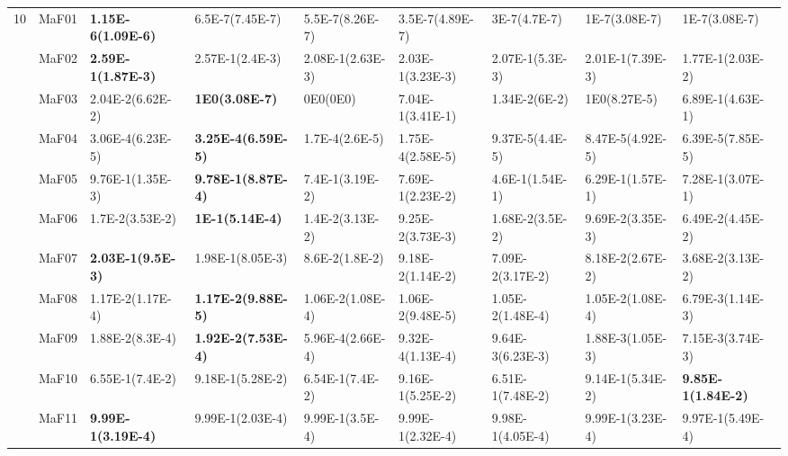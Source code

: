 \documentclass[]{article}
\begin{document}
\begin{landscape}
\begin{table}
\begin{footnotesize}
\begin{tabular}{|l|l|l|l|l|l|l|l|l|}
\multirow{15}{*}{10} & MaF01 & \cellcolor{gray95} {\bf 1.15E-6(1.09E-6)} & \cellcolor{gray95} 6.5E-7(7.45E-7) & \cellcolor{gray95} 5.5E-7(8.26E-7) & \cellcolor{gray95} 3.5E-7(4.89E-7) & \cellcolor{gray95} 3E-7(4.7E-7) & 1E-7(3.08E-7) & 1E-7(3.08E-7)\\
 & MaF02 & \cellcolor{gray95} {\bf 2.59E-1(1.87E-3)} & \cellcolor{gray95} 2.57E-1(2.4E-3) & 2.08E-1(2.63E-3) & 2.03E-1(3.23E-3) & 2.07E-1(5.3E-3) & 2.01E-1(7.39E-3) & 1.77E-1(2.03E-2)\\
 & MaF03 & 2.04E-2(6.62E-2) & \cellcolor{gray95} {\bf 1E0(3.08E-7)} & 0E0(0E0) & 7.04E-1(3.41E-1) & 1.34E-2(6E-2) & \cellcolor{gray95} 1E0(8.27E-5) & 6.89E-1(4.63E-1)\\
 & MaF04 & \cellcolor{gray95} 3.06E-4(6.23E-5) & \cellcolor{gray95} {\bf 3.25E-4(6.59E-5)} & 1.7E-4(2.6E-5) & 1.75E-4(2.58E-5) & 9.37E-5(4.4E-5) & 8.47E-5(4.92E-5) & 6.39E-5(7.85E-5)\\
 & MaF05 & \cellcolor{gray95} 9.76E-1(1.35E-3) & \cellcolor{gray95} {\bf 9.78E-1(8.87E-4)} & 7.4E-1(3.19E-2) & 7.69E-1(2.23E-2) & 4.6E-1(1.54E-1) & 6.29E-1(1.57E-1) & 7.28E-1(3.07E-1)\\
 & MaF06 & 1.7E-2(3.53E-2) & \cellcolor{gray95} {\bf 1E-1(5.14E-4)} & 1.4E-2(3.13E-2) & 9.25E-2(3.73E-3) & 1.68E-2(3.5E-2) & \cellcolor{gray95} 9.69E-2(3.35E-3) & 6.49E-2(4.45E-2)\\
 & MaF07 & \cellcolor{gray95} {\bf 2.03E-1(9.5E-3)} & \cellcolor{gray95} 1.98E-1(8.05E-3) & 8.6E-2(1.8E-2) & 9.18E-2(1.14E-2) & 7.09E-2(3.17E-2) & 8.18E-2(2.67E-2) & 3.68E-2(3.13E-2)\\
 & MaF08 & \cellcolor{gray95} 1.17E-2(1.17E-4) & \cellcolor{gray95} {\bf 1.17E-2(9.88E-5)} & 1.06E-2(1.08E-4) & 1.06E-2(9.48E-5) & 1.05E-2(1.48E-4) & 1.05E-2(1.08E-4) & 6.79E-3(1.14E-3)\\
 & MaF09 & \cellcolor{gray95} 1.88E-2(8.3E-4) & \cellcolor{gray95} {\bf 1.92E-2(7.53E-4)} & 5.96E-4(2.66E-4) & 9.32E-4(1.13E-4) & 9.64E-3(6.23E-3) & 1.88E-3(1.05E-3) & 7.15E-3(3.74E-3)\\
 & MaF10 & 6.55E-1(7.4E-2) & \cellcolor{gray95} 9.18E-1(5.28E-2) & 6.54E-1(7.4E-2) & \cellcolor{gray95} 9.16E-1(5.25E-2) & 6.51E-1(7.48E-2) & \cellcolor{gray95} 9.14E-1(5.34E-2) & \cellcolor{gray95} {\bf 9.85E-1(1.84E-2)}\\
 & MaF11 & \cellcolor{gray95} {\bf 9.99E-1(3.19E-4)} & \cellcolor{gray95} 9.99E-1(2.03E-4) & \cellcolor{gray95} 9.99E-1(3.5E-4) & \cellcolor{gray95} 9.99E-1(2.32E-4) & 9.98E-1(4.05E-4) & 9.99E-1(3.23E-4) & 9.97E-1(5.49E-4)\\

\end{tabular}
\end{footnotesize}
\end{table}
\end{landscape}
\end{document}
